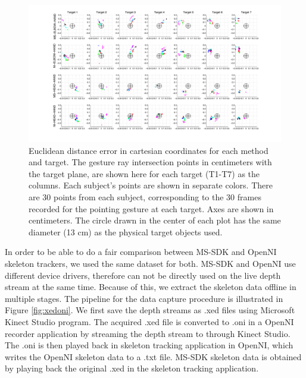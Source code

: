 \begin{landscape}



\begin{figure}[ht!]
\centering
\includegraphics[width=1.5\textwidth]{pics/projections.pdf}
\caption{Euclidean distance error in cartesian coordinates for each method and target. The gesture ray intersection points in centimeters with the target plane, are shown here for each target (T1-T7) as the columns.  Each subject's points are shown in separate colors.  There are 30 points from each subject, corresponding to the 30 frames recorded for the pointing gesture at each target.  Axes are shown in centimeters.  The circle drawn in the center of each plot has the same diameter (13 cm) as the physical target objects used.}
\label{fig:euclidean_projections}
\end{figure}

\end{landscape}

In order to be able to do a fair comparison between MS-SDK and OpenNI skeleton trackers, we used the same dataset for both. MS-SDK and OpenNI use different device drivers, therefore can not be directly used on the live depth stream at the same time. Because of this, we extract the skeleton data offline in multiple stages. The pipeline for the data capture procedure is illustrated in Figure \ref{fig:xedoni}. We first save the depth streams as .xed files using Microsoft Kinect Studio program. The acquired .xed file is converted to .oni in a OpenNI recorder application by streaming the depth stream to through Kinect Studio. The .oni is then played back in skeleton tracking application in OpenNI, which writes the OpenNI skeleton data to a .txt file. MS-SDK skeleton data is obtained by playing back the original .xed in the skeleton tracking application.

